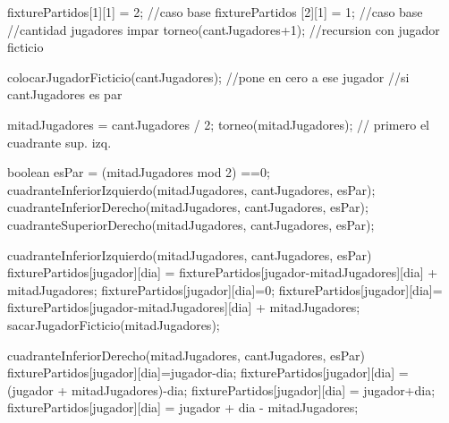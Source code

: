 \documentclass[11pt, a4paper, spanish]{article}
\begin{document}
\begin{algorithmic}

			\STATE	fixturePartidos[1][1] = 2;								//caso base
			\STATE	fixturePartidos [2][1] = 1;	  						//caso base
	\ELSE
			      					\STATE	//cantidad jugadores impar
				\STATE	torneo(cantJugadores+1);      					//recursion con jugador ficticio
				
				\STATE	colocarJugadorFicticio(cantJugadores);  //pone en cero a ese jugador
			\ELSE  \STATE		//si cantJugadores es par
			
				\STATE	mitadJugadores = cantJugadores / 2; 
				\STATE	torneo(mitadJugadores);      						// primero el cuadrante sup. izq.  
				
				\STATE	boolean esPar = (mitadJugadores mod 2) ==0;
				\STATE	cuadranteInferiorIzquierdo(mitadJugadores, cantJugadores, esPar);
				\STATE	cuadranteInferiorDerecho(mitadJugadores, cantJugadores, esPar);
				\STATE	cuadranteSuperiorDerecho(mitadJugadores, cantJugadores, esPar);
			\ENDIF
	 \ENDIF
	
	
	 \STATE	cuadranteInferiorIzquierdo(mitadJugadores, cantJugadores, esPar)
						\STATE	fixturePartidos[jugador][dia] = fixturePartidos[jugador-mitadJugadores][dia] + mitadJugadores;
				\ENDFOR
			\ENDFOR
		\ELSE
						\STATE	fixturePartidos[jugador][dia]=0;
					\ELSE
						\STATE	fixturePartidos[jugador][dia]= fixturePartidos[jugador-mitadJugadores][dia] + mitadJugadores;
					\ENDIF
				\ENDFOR
			\ENDFOR
			\STATE	sacarJugadorFicticio(mitadJugadores);
		\ENDIF
		
		
		\STATE	cuadranteInferiorDerecho(mitadJugadores, cantJugadores, esPar)
						\STATE	fixturePartidos[jugador][dia]=jugador-dia;
					\ELSE
						\STATE	fixturePartidos[jugador][dia] = (jugador + mitadJugadores)-dia;
					\ENDIF
				\ENDFOR
			\ENDFOR
		\ELSE
						\STATE	fixturePartidos[jugador][dia] = jugador+dia;
					\ELSE
						\STATE	fixturePartidos[jugador][dia] = jugador + dia - mitadJugadores;
					\ENDIF
				\ENDFOR
			\ENDFOR
		\ENDIF
	

\end{algorithmic}
\end{document}
